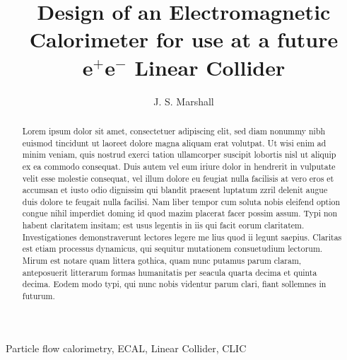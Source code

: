 \documentclass[final,3p,times,twocolumn]{elsarticle}
\begin{document}
  \begin{frontmatter}
    
    \title{Design of an Electromagnetic Calorimeter for use at a future\\ e$^{+}$e$^{-}$ Linear Collider}
    
    \author[a]{J. S. Marshall}
    
    \address[a]{Cavendish Laboratory, University of Cambridge, Cambridge, United Kingdom}

    \begin{abstract}
Lorem ipsum dolor sit amet, consectetuer adipiscing elit, sed diam nonummy nibh euismod tincidunt ut laoreet dolore magna aliquam erat volutpat. Ut wisi enim ad minim veniam, quis
nostrud exerci tation ullamcorper suscipit lobortis nisl ut aliquip ex ea commodo consequat. Duis autem vel eum iriure dolor in hendrerit in vulputate velit esse molestie consequat,
vel illum dolore eu feugiat nulla facilisis at vero eros et accumsan et iusto odio dignissim qui blandit praesent luptatum zzril delenit augue duis dolore te feugait nulla facilisi.
Nam liber tempor cum soluta nobis eleifend option congue nihil imperdiet doming id quod mazim placerat facer possim assum. Typi non habent claritatem insitam; est usus legentis in
iis qui facit eorum claritatem. Investigationes demonstraverunt lectores legere me lius quod ii legunt saepius. Claritas est etiam processus dynamicus, qui sequitur mutationem
consuetudium lectorum. Mirum est notare quam littera gothica, quam nunc putamus parum claram, anteposuerit litterarum formas humanitatis per seacula quarta decima et quinta
decima. Eodem modo typi, qui nunc nobis videntur parum clari, fiant sollemnes in futurum.
    \end{abstract}

    \begin{keyword}
	Particle flow calorimetry, ECAL, Linear Collider, CLIC
    \end{keyword}
  \end{frontmatter}
  
\end{document}
